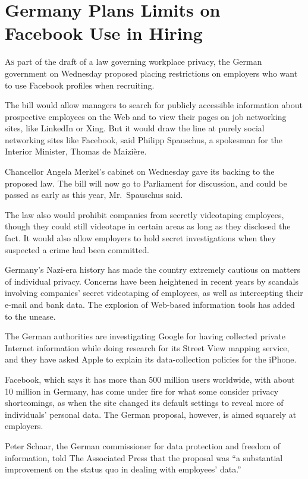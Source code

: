 ﻿\documentclass[12pt]{article}
\begin{document}
\pagebreak
\section{Germany Plans Limits on Facebook Use in Hiring}

\lettrine{A}{s} part of the draft of a law governing workplace privacy, the
German government on Wednesday proposed placing restrictions on employers who want to use Facebook
profiles when recruiting.

The bill would allow managers to search for publicly accessible information about prospective
employees on the Web and to view their pages on job networking sites, like LinkedIn or Xing. But it
would draw the line at purely social networking sites like Facebook, said Philipp Spauschus, a
spokesman for the Interior Minister, Thomas de Maizi\`ere.

Chancellor Angela Merkel's cabinet on Wednesday gave its backing to the proposed law. The bill will
now go to Parliament for discussion, and could be passed as early as this year, Mr.~Spauschus said.

The law also would prohibit companies from secretly videotaping employees, though they could still
videotape in certain areas as long as they disclosed the fact. It would also allow employers to hold
secret investigations when they suspected a crime had been committed.

Germany's Nazi-era history has made the country extremely cautious on matters of individual privacy.
Concerns have been heightened in recent years by scandals involving companies' secret videotaping of
employees, as well as intercepting their e-mail and bank data. The explosion of Web-based
information tools has added to the unease.

The German authorities are investigating Google for having collected private Internet information
while doing research for its Street View mapping service, and they have asked Apple to explain its
data-collection policies for the iPhone.

Facebook, which says it has more than 500 million users worldwide, with about 10 million in Germany,
has come under fire for what some consider privacy shortcomings, as when the site changed its
default settings to reveal more of individuals' personal data. The German proposal, however, is
aimed squarely at employers.

Peter Schaar, the German commissioner for data protection and freedom of information, told The
Associated Press that the proposal was ``a substantial improvement on the status quo in dealing with
employees' data.''
\end{document}
